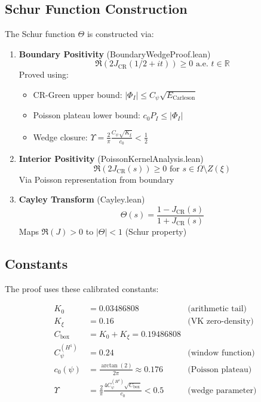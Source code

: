 \documentclass[12pt,a4paper]{article}
\begin{document}
\subsection{Schur Function Construction}

The Schur function $\Theta$ is constructed via:

\begin{enumerate}
    \item \textbf{Boundary Positivity} (BoundaryWedgeProof.lean)
    \begin{equation}
    \Re(2 J_{\text{CR}}(1/2 + it)) \geq 0 \text{ a.e. } t \in \mathbb{R}
    \end{equation}
    Proved using:
    \begin{itemize}
        \item CR-Green upper bound: $|\Phi_I| \leq C_\psi \sqrt{E_{\text{Carleson}}}$
        \item Poisson plateau lower bound: $c_0 P_I \leq |\Phi_I|$
        \item Wedge closure: $\Upsilon = \frac{2}{\pi} \frac{C_\psi \sqrt{K_\xi}}{c_0} < \frac{1}{2}$
    \end{itemize}
    
    \item \textbf{Interior Positivity} (PoissonKernelAnalysis.lean)
    \begin{equation}
    \Re(2 J_{\text{CR}}(s)) \geq 0 \text{ for } s \in \Omega \setminus Z(\xi)
    \end{equation}
    Via Poisson representation from boundary
    
    \item \textbf{Cayley Transform} (Cayley.lean)
    \begin{equation}
    \Theta(s) = \frac{1 - J_{\text{CR}}(s)}{1 + J_{\text{CR}}(s)}
    \end{equation}
    Maps $\Re(J) > 0$ to $|\Theta| < 1$ (Schur property)
\end{enumerate}

\subsection{Constants}

The proof uses these calibrated constants:

\begin{align}
K_0 &= 0.03486808 & \text{(arithmetic tail)}\\
K_\xi &= 0.16 & \text{(VK zero-density)}\\
C_{\text{box}} &= K_0 + K_\xi = 0.19486808\\
C_\psi^{(H^1)} &= 0.24 & \text{(window function)}\\
c_0(\psi) &= \frac{\arctan(2)}{2\pi} \approx 0.176 & \text{(Poisson plateau)}\\
\Upsilon &= \frac{2}{\pi} \frac{4 C_\psi^{(H^1)} \sqrt{C_{\text{box}}}}{c_0} < 0.5 & \text{(wedge parameter)}
\end{align}
\end{document}
